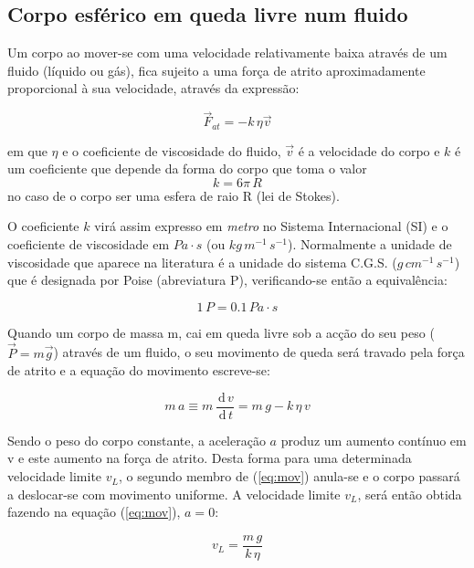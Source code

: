\documentclass[a4paper,twoside,12pt]{article}      %
\newcommand{\ud}{\,\mathrm{d}}
\begin{document}
\subsection{\sf Corpo esférico em queda livre num fluido}
Um corpo ao mover-se com uma velocidade relativamente baixa através de um fluido (líquido ou gás), fica sujeito a uma força de atrito aproximadamente proporcional à sua velocidade, através da expressão:

\begin{equation}
	\label{eq:f_atrito}
	\vec{F}_{at} = - k \, \eta \vec{v}
\end{equation}

em que $\eta$ e o coeficiente de viscosidade do fluido, $\vec{v}$ é a velocidade do corpo e $k$ é um coeficiente que depende da forma do corpo  que toma o valor 
\begin{equation}
	\label{eq:coef_atrito}
	k = 6 \pi \, R
\end{equation}
no caso de o corpo ser uma esfera de raio R (lei de Stokes).

O coeficiente $k$ virá assim expresso em \emph{metro} no Sistema Internacional (SI) e o coeficiente de viscosidade em $Pa\cdot s$ (ou $kg\,m^{-1}\,s^{-1}$).
Normalmente a unidade de viscosidade que aparece na literatura é a unidade do sistema C.G.S. ($g\,cm^{-1}\,s^{-1}$) que é designada por Poise (abreviatura P), verificando-se então a equivalência:

\begin{equation*}
	1 \, P = 0.1\, Pa\cdot s
\end{equation*}

Quando um corpo de massa m, cai em queda livre sob a acção do seu peso ($\vec{P}=m\vec{g}$) através de um fluido, o seu movimento de queda será travado pela força de atrito e a equação do movimento escreve-se:

\begin{equation}
	\label{eq:mov}
	m\,a \equiv m\, \frac{\ud\, v}{\ud\, t} =  m\,g - k  \, \eta \, v
\end{equation}

Sendo o peso do corpo constante, a aceleração $a$ produz um aumento contínuo em v e este aumento na força de atrito. Desta forma para uma determinada velocidade limite $v_L$, o segundo membro de (\ref{eq:mov}) anula-se e o corpo passará a deslocar-se com movimento uniforme. A velocidade limite $v_L$, será então obtida fazendo na equação (\ref{eq:mov}), $a= 0$:

\begin{equation}
	\label{eq:vlimit}
	v_L = \frac{m\,g}{k  \, \eta}
\end{equation}
\end{document}
